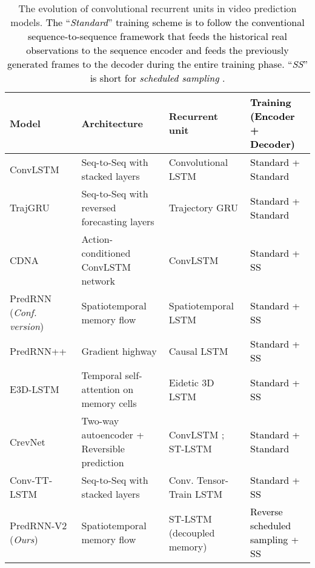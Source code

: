 \documentclass[10pt,journal,compsoc]{IEEEtran}
\newcommand{\revise}[1]{{\textcolor{black}{#1}}}
\begin{document}
\begin{table*}[t]
  \caption{
  The evolution of convolutional recurrent units in video prediction models. 
\revise{The ``\textit{Standard}'' training scheme is to follow the conventional sequence-to-sequence framework \cite{Sutskever2014Sequence} that feeds the historical real observations to the sequence encoder and feeds the previously generated frames to the decoder during the entire training phase. ``\textit{SS}'' is short for \textit{scheduled sampling} \cite{bengio2015scheduled}.}
  }
  \vskip -0.05in
  \label{tab:model_compare}
  \centering
\begin{tabular}{llll}
    \toprule
    Model & Architecture & Recurrent unit & \revise{Training (Encoder + Decoder)} \\
    \midrule
    ConvLSTM \cite{shi2015convolutional} & Seq-to-Seq with stacked layers \cite{Sutskever2014Sequence} & Convolutional LSTM & \revise{Standard \cite{Sutskever2014Sequence} + Standard \cite{Sutskever2014Sequence}}  \\
    TrajGRU \cite{shi2017deep} & Seq-to-Seq with reversed forecasting layers & Trajectory GRU & \revise{Standard + Standard} \\
    CDNA \cite{Finn2016Unsupervised} & Action-conditioned ConvLSTM network & ConvLSTM \cite{shi2015convolutional} & \revise{Standard + SS \cite{bengio2015scheduled}} \\
    PredRNN \cite{wang2017predrnn} (\textit{Conf. version}) & Spatiotemporal memory flow & Spatiotemporal LSTM & \revise{Standard + SS} \\
    PredRNN++ \cite{wang2018predrnn++} & Gradient highway & Causal LSTM & \revise{Standard + SS} \\
    E3D-LSTM \cite{wang2019eidetic} & Temporal self-attention on memory cells & Eidetic 3D LSTM & \revise{Standard + SS } \\
    CrevNet \cite{yu2020efficient} & Two-way autoencoder + Reversible prediction & ConvLSTM \cite{shi2015convolutional}; ST-LSTM \cite{wang2017predrnn} & \revise{Standard + Standard} \\
    Conv-TT-LSTM \cite{su2020convolutional} & Seq-to-Seq with stacked layers & Conv. Tensor-Train LSTM & \revise{Standard + SS } \\
PredRNN-V2 (\textit{Ours}) & Spatiotemporal memory flow & ST-LSTM (decoupled memory) & \revise{Reverse scheduled sampling + SS }\\
    \bottomrule
  \end{tabular}
  \vspace{-10pt}
\end{table*}
\end{document}
